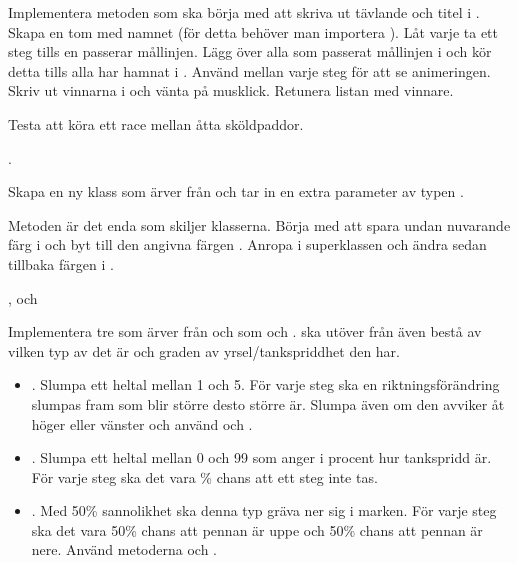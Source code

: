 \Subtask Implementera metoden  som ska börja med att skriva ut tävlande och titel i . Skapa en tom  med namnet  (för detta behöver man importera ). Låt varje  ta ett steg tills en passerar mållinjen. Lägg över alla som passerat mållinjen i  och kör detta tills alla  har hamnat i . Använd  mellan varje steg för att se animeringen. Skriv ut vinnarna i  och vänta på musklick. Retunera listan med vinnare.

\Subtask Testa att köra ett race mellan åtta sköldpaddor.

\Task {}.

\Subtask Skapa en ny klass  som ärver från  och tar in en extra parameter  av typen .

\Subtask Metoden  är det enda som skiljer klasserna. Börja med att spara undan nuvarande färg i  och byt till den angivna färgen . Anropa  i superklassen och ändra sedan tillbaka färgen i .

\Task {},  och 

\Subtask Implementera tre  som ärver från  och som   och .  ska utöver  från  även bestå av vilken typ av  det är och graden av yrsel/tankspriddhet den har.

\begin{itemize}

\item {}. Slumpa ett heltal  mellan 1 och 5. För varje steg ska en riktningsförändring slumpas fram som blir större desto större  är. Slumpa även om den avviker åt höger eller vänster och använd  och .

\item {}. Slumpa ett heltal  mellan 0 och 99 som anger i procent hur tankspridd  är. För varje steg ska det vara \% chans att ett steg inte tas.

\item {}. Med 50\% sannolikhet ska denna typ  gräva ner sig i marken. För varje steg ska det vara 50\% chans att pennan är uppe och 50\% chans att pennan är nere. Använd metoderna  och .

\end{itemize}

